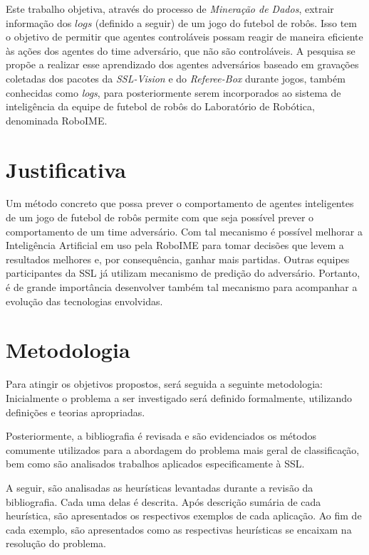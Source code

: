 Este trabalho objetiva, através do processo de \textit{Mineração de Dados}, extrair
informação dos $logs$ (definido a seguir) de um jogo do futebol de robôs.
Isso tem o objetivo de permitir que agentes controláveis
possam reagir de maneira eficiente às ações dos agentes do time adversário, que não são controláveis.
A pesquisa se propõe a realizar esse aprendizado dos agentes adversários baseado em gravações
coletadas dos pacotes da \textit{SSL-Vision} e do \textit{Referee-Box} durante jogos, também conhecidas
como \textit{logs}, para posteriormente serem incorporados ao sistema de inteligência da
equipe de futebol de robôs do Laboratório de Robótica, denominada RoboIME.

\section{Justificativa}%

Um método concreto que possa prever o comportamento de agentes inteligentes de um jogo de
futebol de robôs permite com que seja possível prever o comportamento de um time adversário.
Com tal mecanismo é possível melhorar a Inteligência Artificial em uso pela RoboIME
para tomar decisões que levem a resultados melhores e, por consequência, ganhar mais partidas.
Outras equipes participantes da SSL já utilizam mecanismo de predição do adversário.
Portanto, é de grande importância desenvolver também tal mecanismo para acompanhar a evolução
das tecnologias envolvidas.

\section{Metodologia}

Para atingir os objetivos propostos, será seguida a seguinte metodologia:
Inicialmente o problema a ser investigado será definido formalmente,
utilizando definições e teorias apropriadas.

Posteriormente, a bibliografia é revisada e são evidenciados os métodos comumente
utilizados para a abordagem do problema mais geral de classificação, bem como são
analisados trabalhos aplicados especificamente à SSL.

A seguir, são analisadas as heurísticas levantadas durante a
revisão da bibliografia. Cada uma delas é descrita. Após descrição sumária
de cada heurística, são apresentados os respectivos exemplos de cada aplicação.
Ao fim de cada exemplo, são apresentados como as respectivas heurísticas se encaixam na
resolução do problema.


